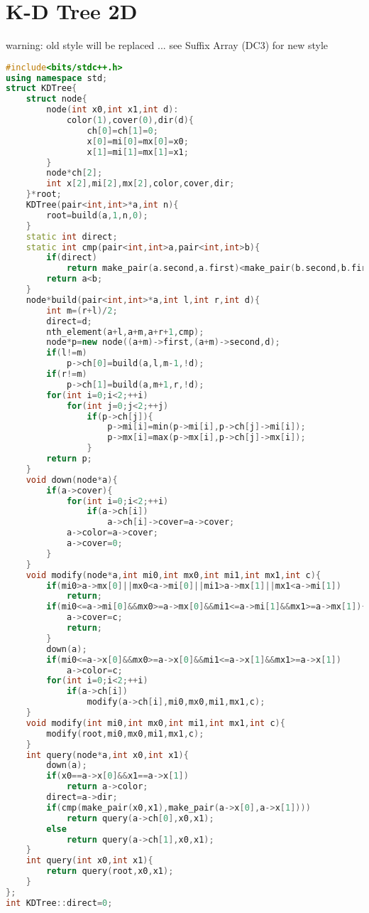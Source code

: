 \documentclass{book}
\begin{document}
\section{K-D Tree 2D}
warning: old style will be replaced ... see Suffix Array (DC3) for new style\begin{lstlisting}[language=C++,title={K-D Tree 2D.hpp (2467 bytes, 80 lines)}]
#include<bits/stdc++.h>
using namespace std;
struct KDTree{
    struct node{
        node(int x0,int x1,int d):
            color(1),cover(0),dir(d){
                ch[0]=ch[1]=0;
                x[0]=mi[0]=mx[0]=x0;
                x[1]=mi[1]=mx[1]=x1;
        }
        node*ch[2];
        int x[2],mi[2],mx[2],color,cover,dir;
    }*root;
    KDTree(pair<int,int>*a,int n){
        root=build(a,1,n,0);
    }
    static int direct;
    static int cmp(pair<int,int>a,pair<int,int>b){
        if(direct)
            return make_pair(a.second,a.first)<make_pair(b.second,b.first);
        return a<b;
    }
    node*build(pair<int,int>*a,int l,int r,int d){
        int m=(r+l)/2;
        direct=d;
        nth_element(a+l,a+m,a+r+1,cmp);
        node*p=new node((a+m)->first,(a+m)->second,d);
        if(l!=m)
            p->ch[0]=build(a,l,m-1,!d);
        if(r!=m)
            p->ch[1]=build(a,m+1,r,!d);
        for(int i=0;i<2;++i)
            for(int j=0;j<2;++j)
                if(p->ch[j]){
                    p->mi[i]=min(p->mi[i],p->ch[j]->mi[i]);
                    p->mx[i]=max(p->mx[i],p->ch[j]->mx[i]);
                }
        return p;
    }
    void down(node*a){
        if(a->cover){
            for(int i=0;i<2;++i)
                if(a->ch[i])
                    a->ch[i]->cover=a->cover;
            a->color=a->cover;
            a->cover=0;
        }
    }
    void modify(node*a,int mi0,int mx0,int mi1,int mx1,int c){
        if(mi0>a->mx[0]||mx0<a->mi[0]||mi1>a->mx[1]||mx1<a->mi[1])
            return;
        if(mi0<=a->mi[0]&&mx0>=a->mx[0]&&mi1<=a->mi[1]&&mx1>=a->mx[1]){
            a->cover=c;
            return;
        }
        down(a);
        if(mi0<=a->x[0]&&mx0>=a->x[0]&&mi1<=a->x[1]&&mx1>=a->x[1])
            a->color=c;
        for(int i=0;i<2;++i)
            if(a->ch[i])
                modify(a->ch[i],mi0,mx0,mi1,mx1,c);
    }
    void modify(int mi0,int mx0,int mi1,int mx1,int c){
        modify(root,mi0,mx0,mi1,mx1,c);
    }
    int query(node*a,int x0,int x1){
        down(a);
        if(x0==a->x[0]&&x1==a->x[1])
            return a->color;
        direct=a->dir;
        if(cmp(make_pair(x0,x1),make_pair(a->x[0],a->x[1])))
            return query(a->ch[0],x0,x1);
        else
            return query(a->ch[1],x0,x1);
    }
    int query(int x0,int x1){
        return query(root,x0,x1);
    }
};
int KDTree::direct=0;
\end{lstlisting}
\end{document}
